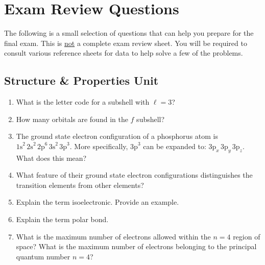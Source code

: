\documentclass[12pt]{article}
\begin{document}
\section*{Exam Review Questions}

The following is a small selection of questions that can help you prepare for the final exam. This is \underline{not} a complete exam review sheet. You will be required to consult various reference sheets for data to help solve a few of the problems.

\subsection*{Structure \& Properties Unit}

\begin{enumerate}[label=\arabic*.]
    \item What is the letter code for a subshell with $\ell = 3$?
    \vspace{1.5cm}

    \item How many orbitals are found in the $f$ subshell?
    \vspace{1.5cm}

    \item The ground state electron configuration of a phosphorus atom is $\text{1s}^2\,\text{2s}^2\,\text{2p}^6\,\text{3s}^2\,\text{3p}^3$. More specifically, $\text{3p}^3$ can be expanded to: $\text{3p}_x\,\text{3p}_y\,\text{3p}_z$. What does this mean?
    \vspace{3cm}

    \item What feature of their ground state electron configurations distinguishes the transition elements from other elements?
    \vspace{3cm}

    \item Explain the term isoelectronic. Provide an example.
    \vspace{3cm}

    \item Explain the term polar bond.
    \vspace{2.5cm}

    \item What is the maximum number of electrons allowed within the $n = 4$ region of space? What is the maximum number of electrons belonging to the principal quantum number $n = 4$?
    \vspace{3cm}


\end{enumerate}
\end{document}
